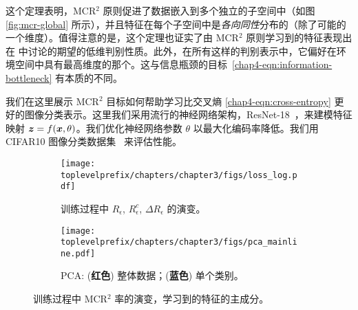 \documentclass[../../book-main_zh.tex]{subfiles}
\begin{document}
这个定理表明，MCR$^2$ 原则促进了数据嵌入到多个独立的子空间中（如图 \ref{fig:mcr-global} 所示），并且特征在每个子空间中是{\em 各向同性}分布的（除了可能的一个维度）。值得注意的是，这个定理也证实了由 MCR$^2$ 原则学习到的特征表现出在  中讨论的期望的低维判别性质。此外，在所有这样的判别表示中，它偏好在环境空间中具有最高维度的那个。这与信息瓶颈的目标~\eqref{chap4-eqn:information-bottleneck} 有本质的不同。



\begin{example}
	我们在这里展示 MCR$^2$ 目标如何帮助学习比交叉熵 \eqref{chap4-eqn:cross-entropy} 更好的图像分类表示。这里我们采用流行的神经网络架构，ResNet-18~\cite{he2016deep}，来建模特征映射 $\bm{z} = f(\bm{x},\theta)$。我们优化神经网络参数 $\theta$ 以最大化编码率降低。我们用 CIFAR10 图像分类数据集~\cite{krizhevsky2009learning} 来评估性能。

	\begin{figure}[t]
		\begin{subfigure}[t]{0.42\textwidth}
			\centering
			\texttt{[image: \\toplevelprefix/chapters/chapter3/figs/loss\_log.pdf]}
			\caption{训练过程中 $R_\epsilon$, $R^c_\epsilon$, $\Delta R_\epsilon$ 的演变。}
			\label{fig:train-test-loss-pca-1}
		\end{subfigure}
		\hfill
		\begin{subfigure}[t]{0.42\textwidth}
			\centering
			\texttt{[image: \\toplevelprefix/chapters/chapter3/figs/pca\_mainline.pdf]}
			\caption{PCA: {\small (\textbf{红色}) 整体数据；(\textbf{蓝色}) 单个类别}。}
			\label{fig:train-test-loss-pca-3}
		\end{subfigure}
		\caption{\small 训练过程中 MCR$^2$ 率的演变，学习到的特征的主成分。}
		\label{fig:train-test-loss-pca}
	\end{figure}



\end{example}
\end{document}
